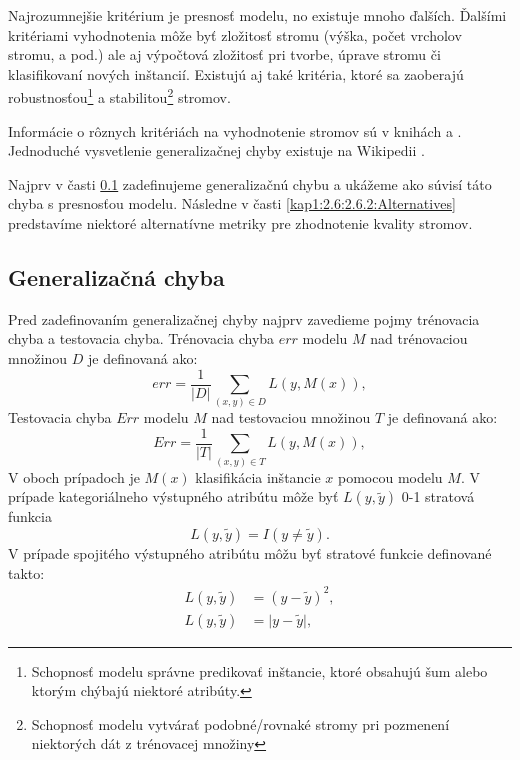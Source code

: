 Najrozumnejšie kritérium je presnosť modelu, no existuje mnoho ďalších. Ďalšími kritériami vyhodnotenia môže byť zložitosť stromu (výška, počet vrcholov stromu, a pod.) ale aj výpočtová zložitosť pri tvorbe, úprave stromu či klasifikovaní nových inštancií. Existujú aj také kritéria, ktoré sa zaoberajú robustnosťou\footnote{Schopnosť modelu správne predikovať inštancie, ktoré obsahujú šum alebo ktorým chýbajú niektoré atribúty.} a stabilitou\footnote{Schopnosť modelu vytvárať podobné/rovnaké stromy pri pozmenení niektorých dát z trénovacej množiny} stromov.

Informácie o rôznych kritériách na vyhodnotenie stromov sú v knihách \cite[s. 364]{kap1-DecisionTree} a \cite[s. 31]{kap1-DataMiningForMasses}. Jednoduché vysvetlenie generalizačnej chyby existuje na Wikipedii \cite{wiki-GeneralizationError}.

Najprv v časti \ref{kap1:2.6:2.6.1:Generalize} zadefinujeme generalizačnú chybu a ukážeme ako súvisí táto chyba s presnosťou modelu. Následne v časti \ref{kap1:2.6:2.6.2:Alternatives} predstavíme niektoré alternatívne metriky pre zhodnotenie kvality stromov.

\subsection{Generalizačná chyba}\label{kap1:2.6:2.6.1:Generalize}
Pred zadefinovaním generalizačnej chyby najprv zavedieme pojmy trénovacia chyba a testovacia chyba.
Trénovacia chyba $err$ modelu $M$ nad trénovaciou množinou $D$ je definovaná ako:
\begin{equation}
err = \dfrac{1}{\lvert D \lvert}\sum_{(x,y) \in D} L(y, M(x)),
\end{equation}
Testovacia chyba $Err$ modelu $M$ nad testovaciou množinou $T$ je definovaná ako:
\begin{equation}
Err = \dfrac{1}{\lvert T \lvert}\sum_{(x,y) \in T} L(y, M(x)),
\end{equation}
V oboch prípadoch je $M(x)$ klasifikácia inštancie $x$ pomocou modelu $M$. V prípade kategoriálneho výstupného atribútu môže byť $L(y,\tilde{y})$ 0-1 stratová funkcia
\begin{equation}
L(y,\tilde{y}) = I(y \ne \tilde{y}).
\end{equation}
V prípade spojitého výstupného atribútu môžu byť stratové funkcie definované takto:
\begin{align}
L(y,\tilde{y}) &= (y - \tilde{y})^2, \nonumber \\
L(y,\tilde{y}) &= \lvert y - \tilde{y} \lvert,
\end{align}

